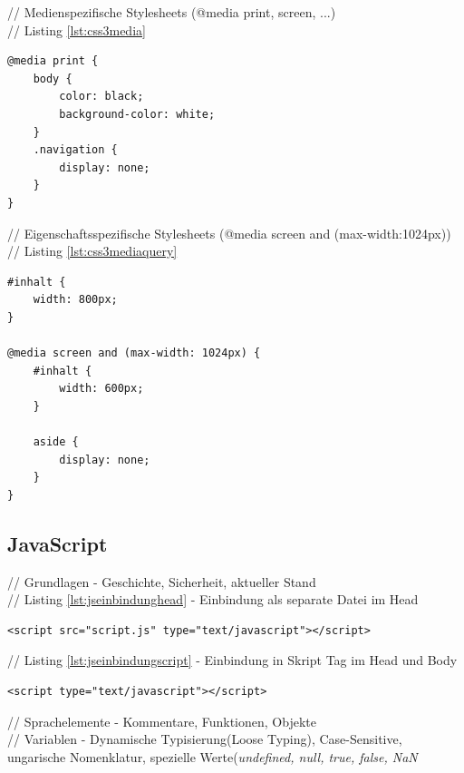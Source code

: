 \documentclass[12pt,a4paper,bibliography=totocnumbered,listof=totocnumbered]{scrartcl}
\begin{document}
// Medienspezifische Stylesheets (@media print, screen, ...)\\
// Listing \ref{lst:css3media}

	\vspace{1em}
	\begin{lstlisting}[caption=CSS3 medienspezifisches Stylesheet, label=lst:css3media]
@media print {
	body {
		color: black;
		background-color: white;
	}
	.navigation {
		display: none;
	}
}
	\end{lstlisting}

// Eigenschaftsspezifische Stylesheets (@media screen and (max-width:1024px))\\
// Listing \ref{lst:css3mediaquery}

	\vspace{1em}
	\begin{lstlisting}[caption=CSS3 eigenschaftsspezifisches Stylesheet, label=lst:css3mediaquery]
#inhalt {
	width: 800px;
}
 
@media screen and (max-width: 1024px) {
	#inhalt {
		width: 600px;
	}
 
	aside {
		display: none;
	}
}
	\end{lstlisting}

\subsection{JavaScript}
// Grundlagen - Geschichte, Sicherheit, aktueller Stand\\
// Listing \ref{lst:jseinbindunghead} - Einbindung als separate Datei im Head
	\vspace{1em}
	\begin{lstlisting}[caption=JavaScript Einbindung als separate Datei im \textit{head}-Element, label=lst:jseinbindunghead]
<script src="script.js" type="text/javascript"></script>
	\end{lstlisting}

// Listing \ref{lst:jseinbindungscript} - Einbindung in Skript Tag im Head und Body
	\vspace{1em}
	\begin{lstlisting}[caption=JavaScript Einbindung in Skript Element im \textit{head}- und \textit{body}-Element, label=lst:jseinbindungscript]
<script type="text/javascript"></script>
	\end{lstlisting}

// Sprachelemente - Kommentare, Funktionen, Objekte\\

// Variablen - Dynamische Typisierung(Loose Typing), Case-Sensitive, ungarische Nomenklatur, spezielle Werte(\textit{undefined, null, true, false, NaN}\\
\end{document}
